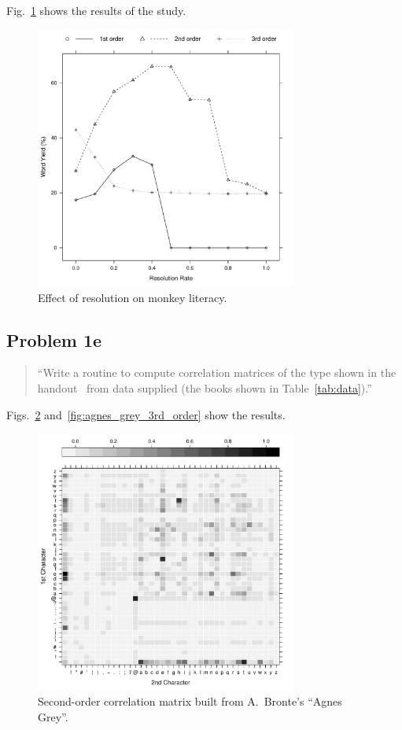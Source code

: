 \documentclass[conference]{IEEEtran}
\newcommand{\codefile}[1]{
  \begin{framed}
  \fontsize{5.65}{6.78}\selectfont
  
  \end{framed}
}
\begin{document}
\codefile{problem1d.py}

Fig.~\ref{fig:problem1d} shows the results of the study.

\begin{figure}[!t]
\centering
\includegraphics[width=3.4in]{problem1d}
\caption{Effect of resolution on monkey literacy.}
\label{fig:problem1d}
\end{figure}


\subsection{Problem 1e}
\label{sec:problem1e}

\begin{quote}
``Write a routine to compute correlation matrices of the type shown in the 
handout~\cite{Bennett1976} from data supplied (the books shown in Table~\ref{tab:data}).''
\end{quote}

\codefile{problem1e.py}

Figs.~\ref{fig:agnes_grey_2nd_order} and~\ref{fig:agnes_grey_3rd_order} show the results.

\begin{figure}[!t]
\centering
\includegraphics[width=3.4in]{agnes_grey_2nd_order}
\caption{Second-order correlation matrix built from A.~Bronte's ``Agnes Grey''.}
\label{fig:agnes_grey_2nd_order}
\end{figure}
\end{document}
